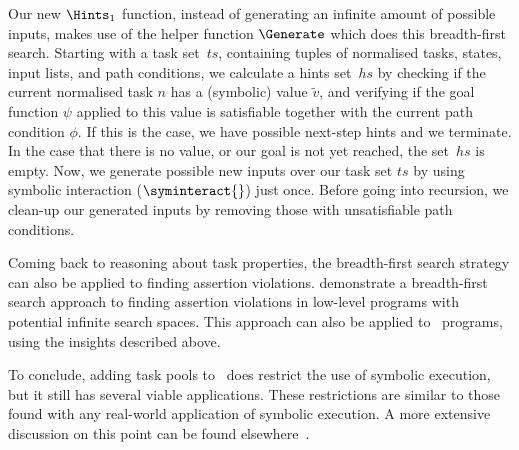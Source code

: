 Our new $\Hints_1$ function, instead of generating an infinite amount of possible inputs,
makes use of the helper function $\Generate$ which does this breadth-first search.
Starting with a task set~$ts$, containing tuples of normalised tasks, states, input lists, and path conditions,
we calculate a hints set~$hs$ by checking if the current normalised task $n$ has a (symbolic) value $\tilde{v}$,
and verifying if the goal function $\psi$ applied to this value is satisfiable together with the current path condition $\phi$.
If this is the case, we have possible next-step hints and we terminate.
In the case that there is no value, or our goal is not yet reached,
the set~$hs$ is empty.
Now, we generate possible new inputs over our task set $ts$ by using symbolic interaction ($\syminteract{}$) just once.
Before going into recursion, we clean-up our generated inputs by removing those with unsatisfiable path conditions.

Coming back to reasoning about task properties, the breadth-first search strategy can also be applied to finding assertion violations.
\citet{DBLP:conf/tap/NausVSR23} demonstrate a breadth-first search approach to finding assertion violations in low-level programs with potential infinite search spaces.
This approach can also be applied to \DYNTOPHAT\ programs, using the insights described above.

To conclude, adding task pools to \TOPHAT\ does restrict the use of symbolic execution, but it still has several viable applications.
These restrictions are similar to those found with any real-world application of symbolic execution.
A more extensive discussion on this point can be found elsewhere~\cite{conf/ifl/NausSK19}.